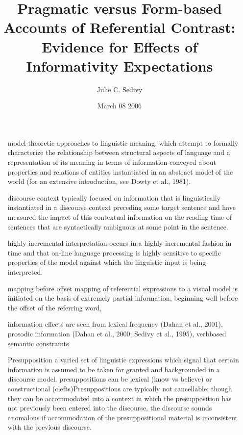 \documentclass[12pt]{article}
\author{Julie C. Sedivy}
\title {Pragmatic versus Form-based Accounts
of Referential Contrast: Evidence for Effects
of Informativity Expectations}
\date{March 08 2006}
\begin{document}
\maketitle

\begin{itemize}
\item [model-theoretic] approaches to
linguistic meaning, which attempt to formally characterize the relationship
between structural aspects of language and a representation of its meaning in
terms of information conveyed about properties and relations of entities
instantiated in an abstract model of the world (for an extensive introduction,
see Dowty et al., 1981).

\item [discourse context] typically focused on information that is linguistically instantiated in a
discourse context preceding some target sentence and have measured the
impact of this contextual information on the reading time of sentences that
are syntactically ambiguous at some point in the sentence.

\item [highly incremental] interpretation
occurs in a highly incremental fashion in time and that on-line language
processing is highly sensitive to specific properties of the model
against which the linguistic input is being interpreted.


\item [mapping before offset] mapping of referential expressions to a visual
model is initiated on the basis of extremely partial information, beginning
well before the offset of the referring word,

\item [information effects] are seen from lexical frequency (Dahan et al.,
2001), prosodic information (Dahan et al., 2000; Sedivy et al., 1995), verbbased
semantic constraints

\item [Presupposition ] a varied
set of linguistic expressions which signal that certain information is assumed
to be taken for granted and backgrounded in a discourse model. presuppositions can be lexical (know vs believe) or constructional (clefts)Presuppositions are typically not cancellable; though they can be accommodated into a
context in which the presupposition has not previously been entered into the
discourse, the discourse sounds anomalous if accommodation of the presuppositional
material is inconsistent with the previous discourse.
\end{itemize}
\end{document}
